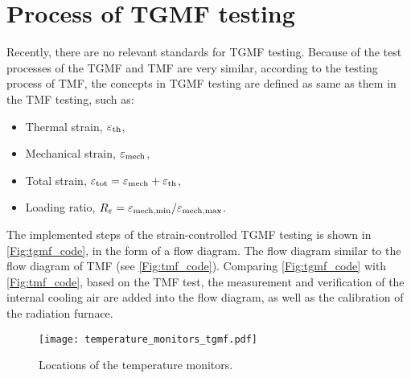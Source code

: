 

\section{Process of TGMF testing}
\noindent
Recently, there are no relevant standards for TGMF testing. Because of the test processes of the TGMF and TMF are very similar, according to the testing process of TMF, the concepts in TGMF testing are defined as same as them in the TMF testing, such as:
\begin{itemize}
  \item {Thermal strain}, $\varepsilon_{\rm{th}}$,
  \item {Mechanical strain}, $\varepsilon_{\rm{mech}}$,
  \item {Total strain}, $\varepsilon_{\rm{tot}}=\varepsilon_{\rm{mech}}+\varepsilon_{\rm{th}}$,
  \item {Loading ratio}, $R_{\varepsilon}=\varepsilon_{\rm{mech,min}}/\varepsilon_{\rm{mech,max}}$.
\end{itemize}


The implemented steps of the strain-controlled TGMF testing is shown in \ref{Fig:tgmf_code}, in the form of a flow diagram. The flow diagram similar to the flow diagram of TMF (see \ref{Fig:tmf_code}). Comparing \ref{Fig:tgmf_code} with \ref{Fig:tmf_code}, based on the TMF test, the measurement and verification of the internal cooling air are added into the flow diagram, as well as the calibration of the radiation furnace.

\begin{figure}[!htp]
	\centering
	\texttt{[image: temperature\_monitors\_tgmf.pdf]}
	\caption{Locations of the temperature monitors.}
	\label{Fig:temperature_monitors_tgmf}
\end{figure}

